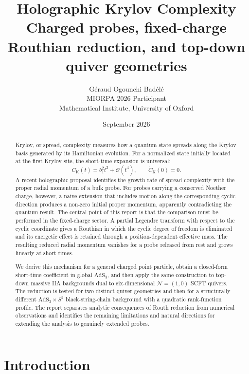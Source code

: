 \documentclass[11pt,a4paper]{article}
\title{\textbf{Holographic Krylov Complexity}\\
\large Charged probes, fixed-charge Routhian reduction, and top-down quiver geometries}
\author{Géraud Ogounchi Badélé\\
MIORPA 2026 Participant\\
Mathematical Institute, University of Oxford}
\date{September 2026}
\theoremstyle{plain}
\theoremstyle{definition}
\theoremstyle{remark}
\begin{document}
\maketitle

\begin{abstract}
Krylov, or spread, complexity measures how a quantum state spreads along the Krylov basis generated by its Hamiltonian evolution. For a normalized state initially located at the first Krylov site, the short-time expansion is universal:
\begin{equation*}
C_{\mathrm K}(t)=b_1^2t^2+\mathcal O(t^4),\qquad
\dot C_{\mathrm K}(0)=0.
\end{equation*}
A recent holographic proposal identifies the growth rate of spread complexity with the proper radial momentum of a bulk probe. For probes carrying a conserved Noether charge, however, a naive extension that includes motion along the corresponding cyclic direction produces a non-zero initial proper momentum, apparently contradicting the quantum result. The central point of this report is that the comparison must be performed in the fixed-charge sector. A partial Legendre transform with respect to the cyclic coordinate gives a Routhian in which the cyclic degree of freedom is eliminated and its energetic effect is retained through a position-dependent effective mass. The resulting reduced radial momentum vanishes for a probe released from rest and grows linearly at short times.

We derive this mechanism for a general charged point particle, obtain a closed-form short-time coefficient in global $\mathrm{AdS}_3$, and then apply the same construction to top-down massive IIA backgrounds dual to six-dimensional $\mathcal N=(1,0)$ SCFT quivers. The reduction is tested for two distinct quiver geometries and then for a structurally different $\mathrm{AdS}_3\times S^2$ black-string-chain background with a quadratic rank-function profile. The report separates analytic consequences of Routh reduction from numerical observations and identifies the remaining limitations and natural directions for extending the analysis to genuinely extended probes.
\end{abstract}

\tableofcontents
\clearpage

\section{Introduction}
\label{sec:intro}
\end{document}
